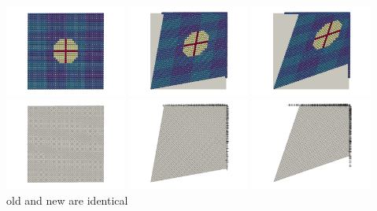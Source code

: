 \begin{center}
\includegraphics[width=4cm]{python_codes/fieldstone_89/results/pureshear/paint0000}
\includegraphics[width=4cm]{python_codes/fieldstone_89/results/pureshear/paint0005}
\includegraphics[width=4cm]{python_codes/fieldstone_89/results/pureshear/paint0010}\\
\includegraphics[width=4cm]{python_codes/fieldstone_89/results/pureshear/old_dirs0000}
\includegraphics[width=4cm]{python_codes/fieldstone_89/results/pureshear/old_dirs0005}
\includegraphics[width=4cm]{python_codes/fieldstone_89/results/pureshear/old_dirs0010}\\
{\captionfont old and new are identical}
\end{center}


